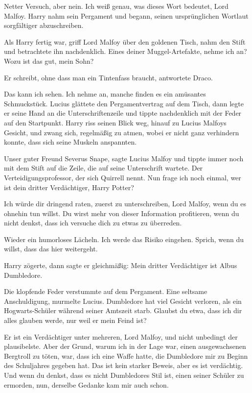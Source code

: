 \glqq{}Netter Versuch, aber nein. Ich weiß genau, was dieses Wort bedeutet, Lord
Malfoy.\grqq{} Harry nahm sein Pergament und begann, seinen ursprünglichen
Wortlaut sorgfältiger abzuschreiben.

Als Harry fertig war, griff Lord Malfoy über den goldenen Tisch, nahm den Stift
und betrachtete ihn nachdenklich. \glqq{}Eines deiner Muggel-Artefakte, nehme ich
an? Wozu ist das gut, mein Sohn?\grqq{}

\glqq{}Er schreibt, ohne dass man ein Tintenfass braucht\grqq{}, antwortete
Draco.

\glqq{}Das kann ich sehen. Ich nehme an, manche finden es ein amüsantes
Schmuckstück.\grqq{} Lucius glättete den Pergamentvertrag auf dem Tisch, dann
legte er seine Hand an die Unterschriftenzeile und tippte nachdenklich mit der
Feder auf den Startpunkt. Harry riss seinen Blick weg, hinauf zu Lucius Malfoys
Gesicht, und zwang sich, regelmäßig zu atmen, wobei er nicht ganz verhindern
konnte, dass sich seine Muskeln anspannten.

\glqq{}Unser guter Freund Severus Snape\grqq{}, sagte Lucius Malfoy und tippte
immer noch mit dem Stift auf die Zeile, die auf seine Unterschrift wartete.
\glqq{}Der Verteidigungsprofessor, der sich Quirrell nennt. Nun frage ich noch
einmal, wer ist dein dritter Verdächtiger, Harry Potter?\grqq{}

\glqq{}Ich würde dir dringend raten, zuerst zu unterschreiben, Lord Malfoy, wenn
du es ohnehin tun willst. Du wirst mehr von dieser Information profitieren, wenn
du nicht denkst, dass ich versuche dich zu etwas zu überreden.\grqq{}

Wieder ein humorloses Lächeln. \glqq{}Ich werde das Risiko eingehen. Sprich, wenn
du willst, dass das hier weitergeht.\grqq{}

Harry zögerte, dann sagte er gleichmäßig: \glqq{}Mein dritter Verdächtiger ist
Albus Dumbledore.\grqq{}

Die klopfende Feder verstummte auf dem Pergament. \glqq{}Eine seltsame
Anschuldigung\grqq{}, murmelte Lucius. \glqq{}Dumbledore hat viel Gesicht
verloren, als ein Hogwarts-Schüler während seiner Amtszeit starb. Glaubst du
etwa, dass ich dir alles glauben werde, nur weil er mein Feind ist?\grqq{}

\glqq{}Er ist ein Verdächtiger unter mehreren, Lord Malfoy, und nicht unbedingt
der plausibelste. Aber der Grund, warum ich in der Lage war, einen
ausgewachsenen Bergtroll zu töten, war, dass ich eine Waffe hatte, die
Dumbledore mir zu Beginn des Schuljahres gegeben hat. Das ist kein starker
Beweis, aber es ist verdächtig. Und wenn du denkst, dass es nicht Dumbledores
Stil ist, einen seiner Schüler zu ermorden, nun, derselbe Gedanke kam mir auch
schon.\grqq{}

